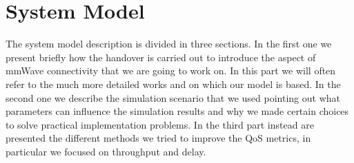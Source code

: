 \documentclass[conference,10pt]{IEEEtran}
\begin{document}
\section{System Model}\label{sec:symo}
The system model description is divided in three sections. In the first one we present briefly how the handover is carried out to introduce the aspect of mmWave connectivity that we are going to work on. In this part we will often refer to the much more detailed works \cite{imphand} and \cite{e2esim} on which our model is based.
In the second one we describe the simulation scenario that we used pointing out what parameters can influence the simulation results and why we made certain choices to solve practical implementation problems.
In the third part instead are presented the different methods we tried to improve the QoS metrics, in particular we focused on throughput and delay.
\end{document}
